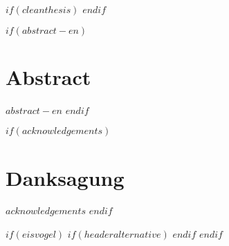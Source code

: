 \renewcommand{\figurename}{Figure}
\renewcommand{\tablename}{Table}

$if(cleanthesis)$
\clearpage
\customtitlebackpage
$endif$




\cleardoublepage
\begin{minipage}{\linewidth}

$if(abstract-en)$
\chapter*{Abstract}
$abstract-en$
$endif$

\end{minipage}
\cleardoublepage




$if(acknowledgements)$
\chapter*{Danksagung}
$acknowledgements$
$endif$




\cleardoublepage



$if(eisvogel)$
$if(headeralternative)$
    \pagestyle{headeralternative}
$endif$
$endif$
